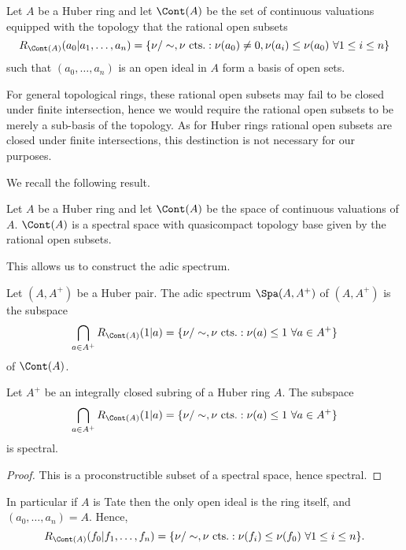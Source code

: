 \begin{definition}\label{def: space of continuous valuations}
    Let $A$ be a Huber ring and let $\Cont(A)$ be the set of continuous valuations equipped with the topology that the rational open subsets 
    $$R_{\Cont(A)}(a_{0}|a_{1},\dots,a_{n})=\left\{\nu/\sim,\nu\text{ cts.}:\nu(a_{0})\neq0,\nu(a_{i})\leq\nu(a_{0})\text{ }\forall 1\leq i\leq n\right\}$$
    such that $(a_{0},\dots,a_{n})$ is an open ideal in $A$ form a basis of open sets. 
\end{definition}
\begin{remark}
    For general topological rings, these rational open subsets may fail to be closed under finite intersection, hence we would require the
rational open subsets to be merely a sub-basis of the topology.
As for Huber rings rational open subsets are closed under finite intersections,
this destinction is not necessary for our purposes. 
\end{remark}
We recall the following result. 
\begin{proposition}\label{prop: cont is spectral}
    Let $A$ be a Huber ring and let $\Cont(A)$ be the space of continuous valuations of $A$. $\Cont(A)$ is a spectral space with quasicompact 
topology base given by the rational open subsets. 
\end{proposition}
This allows us to construct the adic spectrum. 
\begin{definition}\label{def: affinoid adic space}
    Let $(A,A^{+})$ be a Huber pair. The adic spectrum $\Spa(A,A^{+})$ of $(A,A^{+})$ is the subspace 
    $$\bigcap_{a\in A^{+}}R_{\Cont(A)}(1|a)=\{\nu/\sim,\nu\text{ cts.}:\nu(a)\leq 1\text{ }\forall a\in A^{+}\}$$
    of $\Cont(A)$.
\end{definition}
\begin{corollary}\label{corr: adic spectrum is spectral}
    Let $A^{+}$ be an integrally closed subring of a Huber ring $A$. The subspace
    $$\bigcap_{a\in A^{+}}R_{\Cont(A)}(1|a)=\{\nu/\sim,\nu\text{ cts.}:\nu(a)\leq 1\text{ }\forall a\in A^{+}\}$$
    is spectral.
\end{corollary}
\begin{proof}
    This is a proconstructible subset of a spectral space, hence spectral. 
\end{proof}
\begin{remark}
    In particular if $A$ is Tate then the only open ideal is the ring itself, and $(a_{0},\dots,a_{n})=A$. 
Hence, 
$$R_{\Cont(A)}(f_{0}|f_{1},\dots,f_{n})=\{\nu/\sim,\nu\text{ cts.}:\nu(f_{i})\leq\nu(f_{0})\text{ }\forall 1\leq i\leq n\}.$$
\end{remark}
